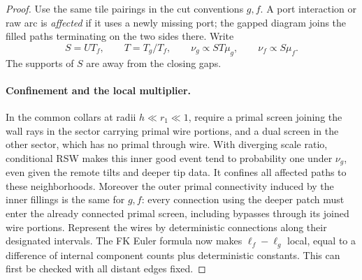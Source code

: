 \begin{proof}
Use the same tile pairings in the cut conventions $g,f$.  A port
interaction or raw arc is \emph{affected} if it uses a newly missing
port; the gapped diagram joins the filled paths terminating on the two
sides there.  Write
\begin{equation}
 S=UT_f,\qquad T=T_g/T_f,\qquad
 \nu_g\propto ST\mu_g,\qquad \nu_f\propto S\mu_f.
 \label{gap:tilted-laws}
\end{equation}
The supports of $S$ are away from the closing gaps.

\paragraph{Confinement and the local multiplier.}
In the common collars at radii $h\ll r_1\ll1$, require a primal
screen joining the wall rays in the sector carrying primal wire
portions, and a dual screen in the other sector, which has no primal
through wire.  With diverging scale ratio, conditional RSW makes this
inner good event tend to probability one under $\nu_g$, even given
the remote tilts and deeper tip data.  It confines all affected paths
to these neighborhoods.  Moreover the outer primal connectivity
induced by the inner fillings is the same for $g,f$: every connection
using the deeper patch must enter the already connected primal screen,
including bypasses through its joined wire portions.  Represent the
wires by deterministic connections along their designated intervals.
The FK Euler formula now makes $\ell_f-\ell_g$ local, equal to a
difference of internal component counts plus deterministic constants.
This can first be checked with all distant edges fixed.


\end{proof}
